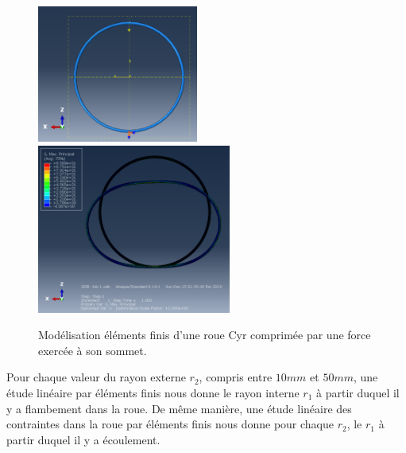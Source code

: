 \begin{figure}[h]
\centering
\includegraphics[width=200]{saut2/elf1.PNG}
\includegraphics[width=241]{saut2/elf2.PNG}
\caption{Modélisation éléments finis d'une roue Cyr comprimée par une force exercée à son sommet.}
\label{fig:elf1}
\end{figure}

Pour chaque valeur du rayon externe $r_2$, compris entre $10 mm$ et $50 mm$, une étude linéaire par éléments finis nous donne le rayon interne $r_1$ à partir duquel il y a flambement dans la roue. 
De même manière, une étude linéaire des contraintes dans la roue par éléments finis nous donne pour chaque $r_2$, le $r_1$ à partir duquel il y a écoulement. 

